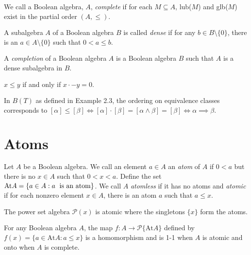 \documentclass[12pt]{article}
\begin{document}
\begin{definition}
We call a Boolean algebra, $A$, \textit{complete} if for each $M\subseteq A$, lub($M$) and glb($M$) exist in the partial order $(A,\le)$.
\end{definition}

\begin{definition}
A subalgebra $A$ of a Boolean algebra $B$ is called \textit{dense} if for any $b\in B\setminus\{0\}$, there is an $a\in A\setminus\{0\}$ such that $0<a\le b$.
\end{definition}

\begin{definition}
A \textit{completion} of a Boolean algebra $A$ is a Boolean algebra $B$ such that $A$ is a dense subalgebra in $B$.
\end{definition}

\begin{lemma}
$x\le y$ if and only if $x\cdot -y = 0$.
\end{lemma}

\begin{example}
In $B(T)$ as defined in Example 2.3, the ordering on equivalence classes corresponds to $[\alpha]\le[\beta]\iff[\alpha]\cdot[\beta]=[\alpha\wedge\beta]=[\beta]\iff\alpha\implies\beta$.
\end{example}

\section{Atoms}

\begin{definition}
Let $A$ be a Boolean algebra. We call an element $a\in A$ an \textit{atom} of $A$ if $0<a$ but there is no $x\in A$ such that $0<x<a$. Define the set $\text{At} A=\{a\in A:a\text{\; is an atom}\}$. We call $A$ \textit{atomless} if it has no atoms and \textit{atomic} if for each nonzero element $x\in A$, there is an atom $a$ such that $a\le x$.
\end{definition}

\begin{example}
The power set algebra $\mathcal{P}(x)$ is atomic where the singletons $\{x\}$ form the atoms.
\end{example}

\begin{theorem}
For any Boolean algebra $A$, the map $f:A\to \mathcal{P}\{\text{At}A\}$ defined by \\$f(x)=\{a\in \text{At}A : a\le x\}$ is a homomorphism and is 1-1 when $A$ is atomic and onto when $A$ is complete.
\end{theorem}
\end{document}
